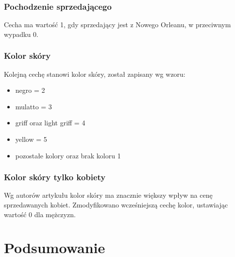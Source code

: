 \documentclass[a4paper,12pt]{article}
\begin{document}
		\subsubsection{Pochodzenie sprzedającego}
		\label{saller_country}
			Cecha ma wartość 1, gdy sprzedający jest z Nowego Orleanu, w przeciwnym wypadku 0.
		
		\subsubsection{Kolor skóry}
		\label{color}
			Kolejną cechę stanowi kolor skóry, został zapisany wg wzoru:
			\begin{itemize}
				\item negro = 2
				\item mulatto = 3
				\item griff oraz light griff = 4
				\item yellow = 5
				\item pozostałe kolory oraz brak koloru 1
			\end{itemize}
		
		\subsubsection{Kolor skóry tylko kobiety}
		\label{color_female}
			Wg autorów artykułu\cite{slave_article} kolor skóry ma znacznie większy wpływ na cenę sprzedawanych kobiet. Zmodyfikowano wcześniejszą cechę kolor, ustawiając wartość 0 dla mężczyzn.

\section{Podsumowanie}
\end{document}
